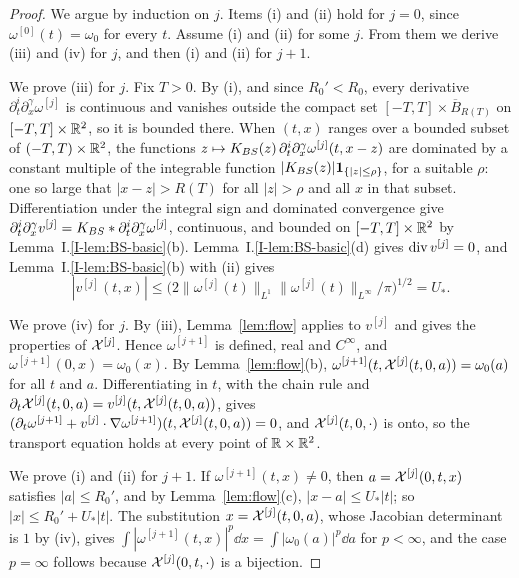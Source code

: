 \begin{proof}
We argue by induction on $j$. Items (i) and (ii) hold for $j=0$, since
$\omega^{[0]}(t)=\omega_0$ for every $t$. Assume (i) and
(ii) for some $j$. From them we derive (iii) and (iv) for $j$, and then (i) and
(ii) for $j+1$.

We prove (iii) for $j$. Fix $T>0$. By (i), and since $R_0'<R_0$, every derivative
$\partial_t^i\partial_x^\gamma\omega^{[j]}$ is continuous and vanishes outside
the compact set $[-T,T]\times\overline B_{R(T)}$ on $[-T,T]\times\mathbb{R}^2$, so it is
bounded there. When $(t,x)$ ranges over a bounded subset of
$(-T,T)\times\mathbb{R}^2$, the functions
$z\mapsto K_{BS}(z)\,\partial_t^i\partial_x^\gamma\omega^{[j]}(t,x-z)$ are dominated
by a constant multiple of the integrable function
$|K_{BS}(z)|\mathbf 1_{\{|z|\le\rho\}}$, for a suitable $\rho$: one so large
that $|x-z|>R(T)$ for all $|z|>\rho$ and all $x$ in that subset. Differentiation under the integral sign
and dominated convergence give
$\partial_t^i\partial_x^\gamma v^{[j]}=K_{BS}\ast\partial_t^i\partial_x^\gamma\omega^{[j]}$,
continuous, and bounded on $[-T,T]\times\mathbb{R}^2$ by Lemma~I.\ref{I-lem:BS-basic}(b).
Lemma~I.\ref{I-lem:BS-basic}(d) gives $\operatorname{div} v^{[j]}=0$, and
Lemma~I.\ref{I-lem:BS-basic}(b) with (ii) gives
\[
|v^{[j]}(t,x)|\le\big(2\|\omega^{[j]}(t)\|_{L^1}\|\omega^{[j]}(t)\|_{L^\infty}/\pi\big)^{1/2}=U_* .
\]

We prove (iv) for $j$. By (iii), Lemma~\ref{lem:flow} applies to $v^{[j]}$ and
gives the properties of $\mathcal{X}^{[j]}$. Hence $\omega^{[j+1]}$ is defined, real
and $C^\infty$, and $\omega^{[j+1]}(0,x)=\omega_0(x)$. By Lemma~\ref{lem:flow}(b),
$\omega^{[j+1]}(t,\mathcal{X}^{[j]}(t,0,a))=\omega_0(a)$ for all $t$ and $a$.
Differentiating in $t$, with the chain rule and
$\partial_t\mathcal{X}^{[j]}(t,0,a)=v^{[j]}(t,\mathcal{X}^{[j]}(t,0,a))$, gives
$(\partial_t\omega^{[j+1]}+v^{[j]}\cdot\nabla\omega^{[j+1]})(t,\mathcal{X}^{[j]}(t,0,a))=0$,
and $\mathcal{X}^{[j]}(t,0,\cdot)$ is onto, so the transport equation holds at every
point of $\mathbb{R}\times\mathbb{R}^2$.

We prove (i) and (ii) for $j+1$. If $\omega^{[j+1]}(t,x)\ne0$, then
$a=\mathcal{X}^{[j]}(0,t,x)$ satisfies $|a|\le R_0'$, and by Lemma~\ref{lem:flow}(c),
$|x-a|\le U_*|t|$; so $|x|\le R_0'+U_*|t|$. The substitution
$x=\mathcal{X}^{[j]}(t,0,a)$, whose Jacobian determinant is $1$ by (iv), gives
$\int|\omega^{[j+1]}(t,x)|^p\dd x=\int|\omega_0(a)|^p\dd a$ for $p<\infty$, and the
case $p=\infty$ follows because $\mathcal{X}^{[j]}(0,t,\cdot)$ is a bijection.
\end{proof}

